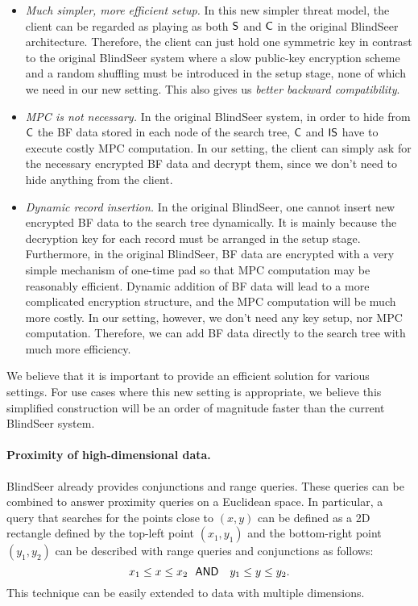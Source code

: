 \begin{itemize}\setlength\itemsep{0em}
\item {\em Much simpler, more efficient setup.}
In this new simpler threat model, the client can be regarded as playing as both
$\sf S$ and $\sf C$ in the original BlindSeer architecture. Therefore, the
client can just hold one symmetric key in contrast to the original BlindSeer
system where a slow public-key encryption scheme and a random shuffling
must be introduced in the setup stage, none of which we need in our new
setting. This also gives us {\em better backward compatibility}.

\item {\em MPC is not necessary.} In the original BlindSeer system, in order to
hide from $\sf C$ the BF data stored in each node of the search tree, $\sf
C$ and $\sf IS$ have to execute costly MPC computation. In our setting, the
    client can simply ask for the necessary encrypted BF data and decrypt them,
    since we don't need to hide anything from the client.  


\item {\em Dynamic record insertion.} In the original BlindSeer, one cannot
insert new encrypted BF data to the search tree dynamically.  It is mainly
because the decryption key for each record must be arranged in the setup
stage.
%
Furthermore, in the original BlindSeer, BF data are encrypted with a very
simple mechanism of one-time pad so that MPC computation may be reasonably
efficient. Dynamic addition of BF data will lead to a more complicated
encryption structure, and the MPC computation will be much more costly.
In our setting, however, we don't need any key setup, nor MPC computation.
Therefore, we can add BF data directly to the search tree with much more
efficiency.  
\end{itemize}

\noindent We believe that it is important to provide an efficient solution for various
settings. For use cases where this new setting is appropriate, we believe this simplified
construction will be an order of magnitude faster than the current BlindSeer system.

\paragraph{Proximity of high-dimensional data.}
BlindSeer already provides conjunctions and range queries.  These queries can be combined to answer proximity queries on a Euclidean space.
In particular, a query that searches for the points close to $(x, y)$ can be defined as a 2D rectangle defined by the top-left point $(x_1, y_1)$ and the
bottom-right point $(y_1, y_2)$ can be described with range queries and
conjunctions as follows: $$ x_1 \le x \le x_2 ~~{\sf AND}~~~ y_1 \le y \le y_2.
$$ This technique can be easily extended to data with multiple dimensions. 

